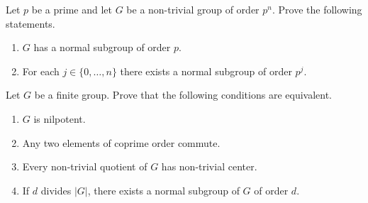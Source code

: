 
\begin{prob}
	\label{xca:pgrupos}
	Let $p$ be a prime and let $G$ be a non-trivial group of order $p^n$. Prove the following statements.
	\begin{enumerate}
		\item $G$ has a normal subgroup of order $p$.
		\item For each $j\in\{0,\dots,n\}$ there exists a normal subgroup of order $p^j$. 
	\end{enumerate}
\end{prob}


\begin{prob}
\label{xca:nilpotente_equivalencia}
	Let $G$ be a finite group. Prove that the following conditions are equivalent.
	\begin{enumerate}
		\item $G$ is nilpotent.
		\item Any two elements of coprime order commute. 
		\item Every non-trivial quotient of $G$ has non-trivial center.
		\item If $d$ divides $|G|$, there exists a normal subgroup of $G$ of order $d$. 
		\end{enumerate}
\end{prob}

